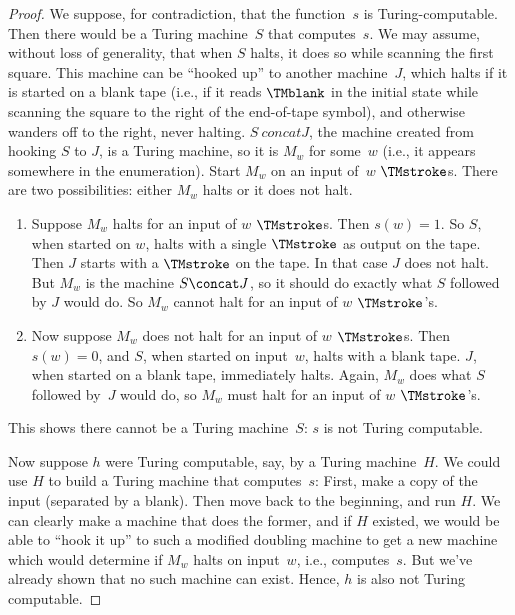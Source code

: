 \documentclass[../../../include/open-logic-section]{subfiles}
\begin{document}
\begin{proof}
We suppose, for contradiction, that the function~$s$ is
Turing-computable.  Then there would be a Turing machine~$S$ that
computes~$s$. We may assume, without loss of generality, that when $S$
halts, it does so while scanning the first square.  This machine can
be ``hooked up'' to another machine~$J$, which halts if it is started on a
blank tape (i.e., if it reads $\TMblank$ in the initial state while
scanning the square to the right of the end-of-tape symbol), and
otherwise wanders off to the right, never halting. $S \ concat J$, the
machine created from hooking $S$ to $J$, is a Turing machine, so it is
$M_w$ for some~$w$ (i.e., it appears somewhere in the enumeration). Start $M_w$
on an input of~$w$ $\TMstroke$s. There are two possibilities: either
$M_w$ halts or it does not halt.
\begin{enumerate}
\item Suppose $M_w$ halts for an input of $w$ $\TMstroke$s. Then $s(w)
  = 1$. So $S$, when started on $w$, halts with a single $\TMstroke$
  as output on the tape.  Then $J$ starts with a $\TMstroke$ on the
  tape. In that case $J$ does not halt. But $M_w$ is the machine $S
  \concat J$, so it should do exactly what $S$ followed by $J$ would
  do.  So $M_w$ cannot halt for an input of $w$ $\TMstroke$'s.

\item Now suppose $M_w$ does not halt for an input of $w$
  $\TMstroke$s.  Then $s(w) = 0$, and $S$, when started on input~$w$,
  halts with a blank tape.  $J$, when started on a blank tape,
  immediately halts.  Again, $M_w$ does what $S$ followed by~$J$ would
  do, so $M_w$ must halt for an input of $w$ $\TMstroke$'s.
\end{enumerate}
This shows there cannot be a Turing machine~$S$: $s$ is not Turing
computable.

Now suppose $h$ were Turing computable, say, by a Turing machine~$H$.
We could use $H$ to build a Turing machine that computes~$s$: First,
make a copy of the input (separated by a blank). Then move back to the
beginning, and run $H$.  We can clearly make a machine that does the
former, and if $H$ existed, we would be able to ``hook it up'' to such
a modified doubling machine to get a new machine which would determine
if $M_w$ halts on input~$w$, i.e., computes~$s$. But we've already
shown that no such machine can exist. Hence, $h$ is also not Turing
computable.
\end{proof}
\end{document}
